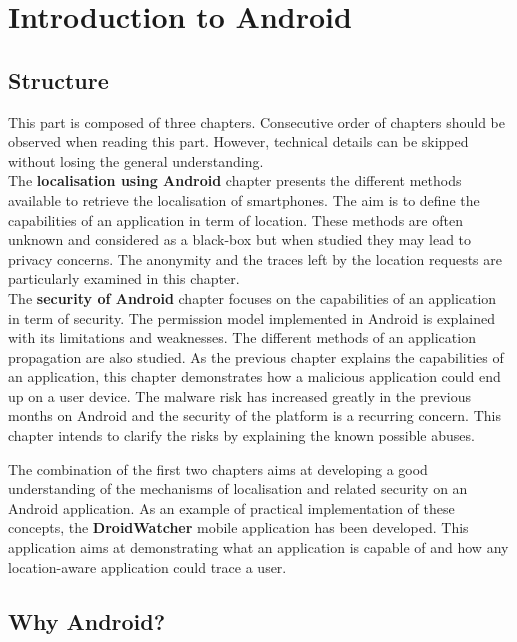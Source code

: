 \chapter{Introduction to Android}
\label{chap:andro-intro}

\section*{Structure}
\label{sec:intro-andro-structure}
This part is composed of three chapters.
Consecutive order of chapters should be observed when reading this part.
However, technical details can be skipped without losing the general understanding.\\

The \textbf{localisation using Android} chapter presents the different methods available to retrieve the localisation of smartphones.
The aim is to define the capabilities of an application in term of location.
These methods are often unknown and considered as a black-box but when studied they may lead to privacy concerns.
The anonymity and the traces left by the location requests are particularly examined in this chapter.\\

The \textbf{security of Android} chapter focuses on the capabilities of an application in term of security.
The permission model implemented in Android is explained with its limitations and weaknesses.
The different methods of an application propagation are also studied.
As the previous chapter explains the capabilities of an application, this chapter demonstrates how a malicious application could end up on a user device.
The malware risk has increased greatly in the previous months on Android and the security of the platform is a recurring concern.
This chapter intends to clarify the risks by explaining the known possible abuses.

The combination of the first two chapters aims at developing a good understanding of the mechanisms of localisation and related security on an Android application.
As an example of practical implementation of these concepts, the \textbf{DroidWatcher} mobile application has been developed.
This application aims at demonstrating what an application is capable of and how any location-aware application could trace a user.

\section*{Why Android?}
\label{sec:why-android}


